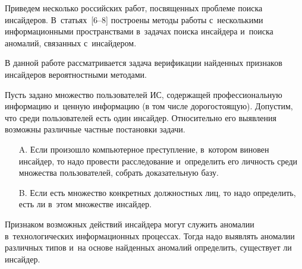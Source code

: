 \begin{multicols}{2}
  Приведем несколько российских работ, посвященных проблеме поиска 
инсайдеров. В~статьях~[6--8] построены методы работы с~несколькими 
информационными пространствами в~задачах поиска инсайдера и~поиска 
аномалий, связанных с~инсайдером.
  
   В данной работе рассматривается задача верификации найденных признаков 
инсайдеров вероятностными методами.
  
  Пусть задано множество пользователей ИС, содержащей профессиональную 
информацию и~ценную информацию (в том числе дорогостоящую). Допустим, 
что среди пользователей есть один инсайдер. Относительно его выявления 
возможны различные частные постановки задачи.
  \begin{itemize}
  \item[A.] 
Если произошло компьютерное преступление, в~котором виновен 
инсайдер, то надо провести расследование и~определить его личность 
среди множества пользователей, собрать доказательную базу.
\item [B.] Если есть множество конкретных должностных лиц, то надо 
определить, есть ли в~этом множестве инсайдер.
\end{itemize}
 
  Признаком возможных действий инсайдера могут служить аномалии 
  в~технологических информационных процессах. Тогда надо выявлять аномалии 
различных типов и~на основе найденных аномалий определить, существует ли 
инсайдер.
  

\end{multicols}
